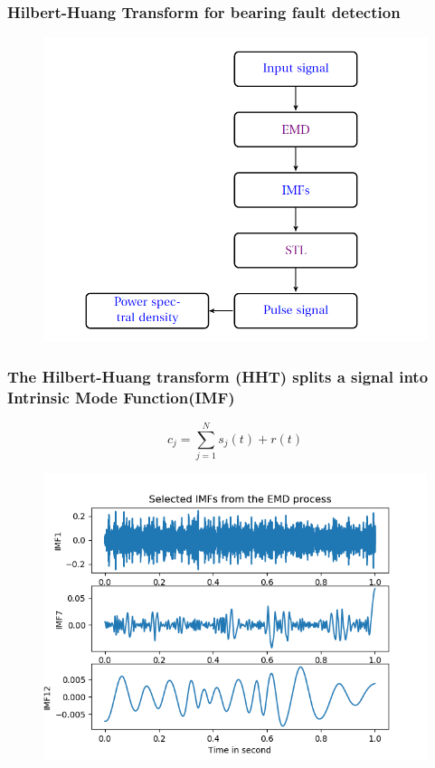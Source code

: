 \documentclass{beamer}
\begin{document}
\begin{frame}
	\frametitle{Hilbert-Huang Transform for bearing fault detection}
	\begin{figure}[H]
		\centering
		\includegraphics[width=0.8\linewidth]{new_method}
	\end{figure}
\end{frame}

\begin{frame}
	\frametitle{The Hilbert-Huang transform (HHT) splits a signal into Intrinsic Mode Function(IMF)}
		\begin{equation}
	c_{j} = \sum_{j=1}^{N}s_{j}(t) + r(t)
	\end{equation}
	\begin{figure}[H]
		\centering
		\includegraphics[width=0.6\linewidth]{selected_imf}
	\end{figure}
\end{frame}
\end{document}
